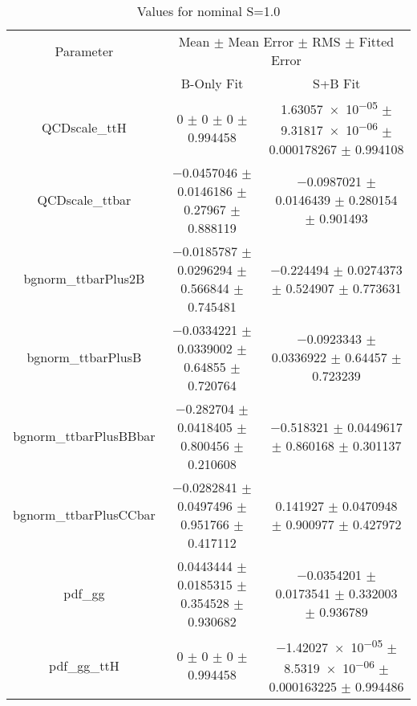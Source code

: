 \begin{table}
\centering
\caption{Values for nominal S=1.0}
\begin{tabular}{ccc}
\toprule
Parameter & \multicolumn{2}{c}{Mean $\pm$ Mean Error $\pm$ RMS $\pm$ Fitted Error}\\
 & B-Only Fit & S+B Fit\\
\midrule
QCDscale\_ttH & \num{0} $\pm$ \num{0} $\pm$ \num{0} $\pm$ \num{0.994458} & \num{1.63057e-05} $\pm$ \num{9.31817e-06} $\pm$ \num{0.000178267} $\pm$ \num{0.994108}\\
QCDscale\_ttbar & \num{-0.0457046} $\pm$ \num{0.0146186} $\pm$ \num{0.27967} $\pm$ \num{0.888119} & \num{-0.0987021} $\pm$ \num{0.0146439} $\pm$ \num{0.280154} $\pm$ \num{0.901493}\\
bgnorm\_ttbarPlus2B & \num{-0.0185787} $\pm$ \num{0.0296294} $\pm$ \num{0.566844} $\pm$ \num{0.745481} & \num{-0.224494} $\pm$ \num{0.0274373} $\pm$ \num{0.524907} $\pm$ \num{0.773631}\\
bgnorm\_ttbarPlusB & \num{-0.0334221} $\pm$ \num{0.0339002} $\pm$ \num{0.64855} $\pm$ \num{0.720764} & \num{-0.0923343} $\pm$ \num{0.0336922} $\pm$ \num{0.64457} $\pm$ \num{0.723239}\\
bgnorm\_ttbarPlusBBbar & \num{-0.282704} $\pm$ \num{0.0418405} $\pm$ \num{0.800456} $\pm$ \num{0.210608} & \num{-0.518321} $\pm$ \num{0.0449617} $\pm$ \num{0.860168} $\pm$ \num{0.301137}\\
bgnorm\_ttbarPlusCCbar & \num{-0.0282841} $\pm$ \num{0.0497496} $\pm$ \num{0.951766} $\pm$ \num{0.417112} & \num{0.141927} $\pm$ \num{0.0470948} $\pm$ \num{0.900977} $\pm$ \num{0.427972}\\
pdf\_gg & \num{0.0443444} $\pm$ \num{0.0185315} $\pm$ \num{0.354528} $\pm$ \num{0.930682} & \num{-0.0354201} $\pm$ \num{0.0173541} $\pm$ \num{0.332003} $\pm$ \num{0.936789}\\
pdf\_gg\_ttH & \num{0} $\pm$ \num{0} $\pm$ \num{0} $\pm$ \num{0.994458} & \num{-1.42027e-05} $\pm$ \num{8.5319e-06} $\pm$ \num{0.000163225} $\pm$ \num{0.994486}\\
\bottomrule
\end{tabular}
\end{table}
